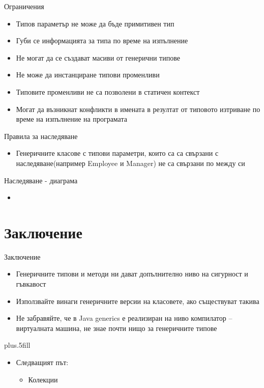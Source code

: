 \documentclass{beamer}
\begin{document}
\begin{frame}{Ограничения}
  \transdissolve
  \begin{itemize}
  \item Типов параметър не може да бъде примитивен тип
  \item Губи се информацията за типа по време на изпълнение
  \item Не могат да се създават масиви от генерични типове
  \item Не може да инстанциране типови променливи
  \item Типовите променливи не са позволени в статичен контекст
  \item Могат да възникнат конфликти в имената в резултат от типовото
    изтриване по време на изпълнение на програмата
  \end{itemize}
\end{frame}

\begin{frame}{Правила за наследяване}
  \transdissolve
  \begin{itemize}
  \item   Генеричните класове с типови
    параметри, които са са свързани с
    наследяване(например Employee и
    Manager) не са свързани по между си
  \end{itemize}
\end{frame}

\begin{frame}{Наследяване - диаграма}
  \transdissolve
  \begin{itemize}
  \item 
  \end{itemize}
\end{frame}


\section*{Заключение}

\begin{frame}{Заключение}
  \transdissolve
  \begin{itemize}
  \item Генеричните типови и методи ни дават
    допълнително ниво на сигурност и
    гъвкавост
   \item Използвайте винаги генеричните версии
    на класовете, ако съществуват такива
   \item Не забравяйте, че в Java generics е
    реализиран на ниво компилатор –
    виртуалната машина, не знае почти
    нищо за генеричните типове
  \end{itemize}
  
  \vskip0pt plus.5fill
  \begin{itemize}
  \item
    Следващият път:
    \begin{itemize}
    \item
      Колекции
    \end{itemize}
  \end{itemize}
\end{frame}
\end{document}
